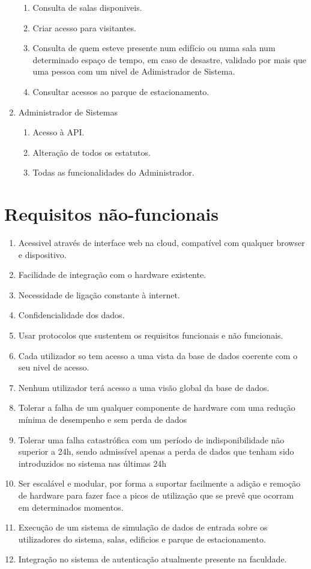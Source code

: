 \documentclass[a4paper]{report}
\begin{document}
\begin{enumerate}
\begin{enumerate}
    \item Consulta de salas disponiveis.
    \item Criar acesso para visitantes.
    \item Consulta de quem esteve presente num edifício ou numa sala num determinado espaço de tempo, em caso de desastre, validado por mais que uma pessoa com um nivel de Adimistrador de Sistema.
    \item Consultar acessos ao parque de estacionamento.
	\end{enumerate}
\item Administrador de Sistemas
	\begin{enumerate}
    \item Acesso à API.
    \item Alteração de todos os estatutos.
    \item Todas as funcionalidades do Administrador.
    \end{enumerate}
\end{enumerate}
\section{Requisitos não-funcionais}
\begin{enumerate}
\item Acessivel através de interface web na cloud, compatível com qualquer browser e dispositivo.
\item Facilidade de integração com o hardware existente.
\item Necessidade de ligação constante à internet.
\item Confidencialidade dos dados.
\item Usar protocolos que sustentem os requisitos funcionais e não funcionais.
\item Cada utilizador so tem acesso a uma vista da base de dados coerente com o seu nivel de acesso.
\item Nenhum utilizador terá acesso a uma visão global da base de dados.
\item Tolerar a falha de um qualquer componente de hardware com uma redução mínima de desempenho e sem perda de dados
\item Tolerar uma falha catastrófica com um período de indisponibilidade não superior a 24h, sendo admissível apenas a perda de dados que tenham sido introduzidos no sistema nas últimas 24h
\item Ser escalável e modular, por forma a suportar facilmente a adição e remoção de hardware para fazer face a picos de utilização que se prevê que ocorram em determinados momentos.
\item Execução de um sistema de simulação de dados de entrada sobre os utilizadores do sistema, salas, edificios e parque de estacionamento.
\item Integração no sistema de autenticação atualmente presente na faculdade.
\end{enumerate}
\end{document}
